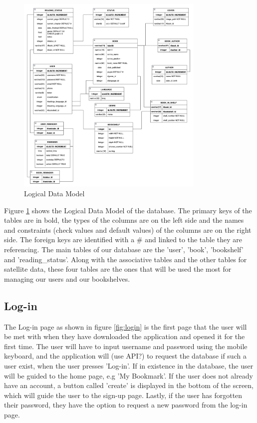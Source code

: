 \documentclass[conference]{IEEEtran}
\begin{document}
\begin{figure}[h]
    \centering
    \includegraphics[width=9cm]{Resources/Specifications/LDM.png}
    \caption{Logical Data Model\cite{LDM}}
    \label{fig:ldm}
\end{figure}

Figure \ref{fig:ldm} shows the Logical Data Model of the database. The primary keys of the tables are in bold, the types of the columns are on the left side and the names and constraints (check values and default values) of the columns are on the right side. The foreign keys are identified with a \# and linked to the table they are referencing.
The main tables of our database are the 'user', 'book', 'bookshelf' and 'reading\_status'. Along with the associative tables and the other tables for satellite data, these four tables are the ones that will be used the most for managing our users and our bookshelves.

\subsection{Log-in}

The Log-in page as shown in figure \ref{fig:login} is the first page that the user will be met with when they have downloaded the application and opened it for the first time. The user will have to input username and password using the mobile keyboard, and the application will (use API?) to request the database if such a user exist, when the user presses 'Log-in'. If in existence in the database, the user will be guided to the home page, e.g 'My Bookmark'. If the user does not already have an account, a button called 'create' is displayed in the bottom of the screen, which will guide the user to the sign-up page. Lastly, if the user has forgotten their password, they have the option to request a new password from the log-in page.
\end{document}
